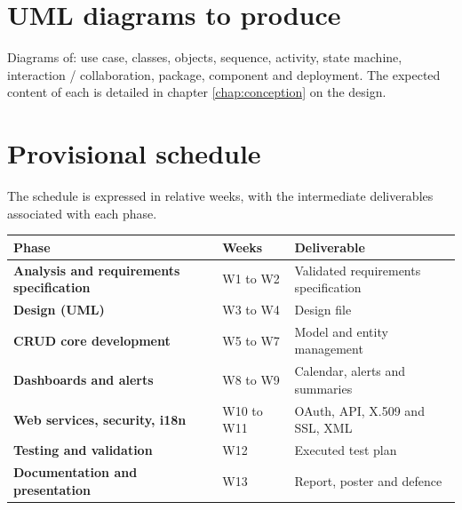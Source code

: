\section{UML diagrams to produce}
Diagrams of: use case, classes, objects, sequence, activity, state machine,
interaction / collaboration, package, component and deployment. The expected
content of each is detailed in chapter \ref{chap:conception} on the design.

\section{Provisional schedule}
The schedule is expressed in relative weeks, with the intermediate deliverables
associated with each phase.
\begin{xltabular}{\textwidth}{>{\bfseries}p{4.5cm} C{2.2cm} X}
\toprule
\textbf{Phase} & \textbf{Weeks} & \textbf{Deliverable} \\
\midrule
\endhead
Analysis and requirements specification & W1 to W2 & Validated requirements specification \\
Design (UML) & W3 to W4 & Design file \\
CRUD core development & W5 to W7 & Model and entity management \\
Dashboards and alerts & W8 to W9 & Calendar, alerts and summaries \\
Web services, security, i18n & W10 to W11 & OAuth, API, X.509 and SSL, XML \\
Testing and validation & W12 & Executed test plan \\
Documentation and presentation & W13 & Report, poster and defence \\
\bottomrule
\end{xltabular}
